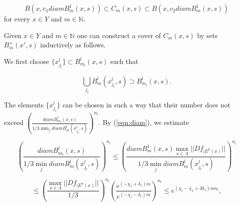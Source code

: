 \documentclass{amsart}
\theoremstyle{plain}
\theoremstyle{definition}
\theoremstyle{remark}
\numberwithin{equation}{section}
\begin{document}
\begin{equation}\label{eqn:C-relation}
 B(x, c_1   diam B^1_m(x,s))  \subset C_m(x,s)  \subset    B(x, c_2   diam B^1_m(x,s))   
\end{equation}
for every $ x\in Y$ and $m\in\mathbb{N}$.









Given $x\in Y$ and $m\in\mathbb{N}$ one can construct a cover of $C_m(x,s)$ by sets $B^{\times}_m(x',s)$ inductively as follows.

We first choose $\{   x^l_{j_l}   \} \subset  B^l_{m_l}(x,s)$ such that

$$  \bigcup_{j_l}     B^l_m(x^l_{j_l},s)      \supset  B^l_{m_l}(x,s).  $$



The elements  $\{   x^l_{j_l}   \}$ can be chosen in such a way that their number does not exceed
$  \left( \frac{diam B^l_{m_l}(x,s)}{1/3 \min_j diam    B^l_{m}(x^l_{j_l},s) }  \right)^{n_l} .$
By (\ref{eqn:diam}), we estimate

$$  \left( \frac{diam B^l_{m_l}(x,s)}{1/3 \min_j diam    B^l_{m}(x^l_{j_l},s) }  \right)^{n_l}  \leq  \left( \frac{diam B^1_{m}(x,s)   \max_{x\in\Lambda}||Df_{|E^u(x)}||}{1/3 \min_j diam    B^l_{m}(x^l_{j_l},s) }  \right)^{n_l} $$

$$  \leq      \left(\frac{\max_{x\in\Lambda}||Df_{|E^u(x)}||}{1/3 }\right)^{n_l}     \left( \frac{e^{(-\chi_1 +\delta_1)m}}{e^{(-\chi_l-\delta_1)m}}  \right)^{n_l}    \leq   e^{(\chi_l - \chi_1 + 3\delta_1)m n_l},$$
\end{document}
